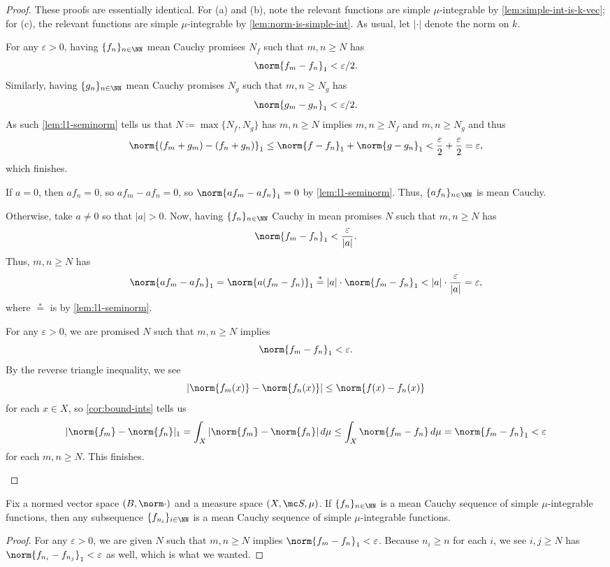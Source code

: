 \documentclass[../notes.tex]{subfiles}
\begin{document}
\begin{proof}
	These proofs are essentially identical. For (a) and (b), note the relevant functions are simple $\mu$-integrable by \autoref{lem:simple-int-is-k-vec}; for (c), the relevant functions are simple $\mu$-integrable by \autoref{lem:norm-is-simple-int}. As usual, let $|\cdot|$ denote the norm on $k$.
	\begin{listalph}
		\item For any $\varepsilon>0$, having $\{f_n\}_{n\in\NN}$ mean Cauchy promises $N_f$ such that $m,n\ge N$ has
		\[\norm{f_m-f_n}_1<\varepsilon/2.\]
		Similarly, having $\{g_n\}_{n\in\NN}$ mean Cauchy promises $N_g$ such that $m,n\ge N_g$ has
		\[\norm{g_m-g_n}_1<\varepsilon/2.\]
		As such \autoref{lem:l1-seminorm} tells us that $N\coloneqq\max\{N_f,N_g\}$ has $m,n\ge N$ implies $m,n\ge N_f$ and $m,n\ge N_g$ and thus
		\[\norm{(f_m+g_m)-(f_n+g_n)}_1\le\norm{f-f_n}_1+\norm{g-g_n}_1<\frac\varepsilon2+\frac\varepsilon2=\varepsilon,\]
		which finishes.
		\item If $a=0$, then $af_n=0$, so $af_m-af_n=0$, so $\norm{af_m-af_n}_1=0$ by \autoref{lem:l1-seminorm}. Thus, $\{af_n\}_{n\in\NN}$ is mean Cauchy.

		Otherwise, take $a\ne0$ so that $|a|>0$. Now, having $\{f_n\}_{n\in\NN}$ Cauchy in mean promises $N$ such that $m,n\ge N$ has
		\[\norm{f_m-f_n}_1<\frac\varepsilon{|a|}.\]
		Thus, $m,n\ge N$ has
		\[\norm{af_m-af_n}_1=\norm{a(f_m-f_n)}_1\stackrel*=|a|\cdot\norm{f_m-f_n}_1<|a|\cdot\frac\varepsilon{|a|}=\varepsilon,\]
		where $\stackrel*=$ is by \autoref{lem:l1-seminorm}.
		\item For any $\varepsilon>0$, we are promised $N$ such that $m,n\ge N$ implies
		\[\norm{f_m-f_n}_1<\varepsilon.\]
		By the reverse triangle inequality, we see
		\[|\norm{f_m(x)}-\norm{f_n(x)}|\le\norm{f(x)-f_n(x)}\]
		for each $x\in X$, so \autoref{cor:bound-ints} tells us
		\[|\norm {f_m}-\norm{f_n}|_1=\int_X|\norm {f_m}-\norm{f_n}|\,d\mu\le\int_X\norm{{f_m}-f_n}\,d\mu=\norm{f_m-f_n}_1<\varepsilon\]
		for each $m,n\ge N$. This finishes.
		\qedhere
	\end{listalph}
\end{proof}
\begin{lemma} \label{lem:mean-cauchy-subsequence}
	Fix a normed vector space $(B,\norm\cdot)$ and a measure space $(X,\mc S,\mu)$. If $\{f_n\}_{n\in\NN}$ is a mean Cauchy sequence of simple $\mu$-integrable functions, then any subsequence $\{f_{n_i}\}_{i\in\NN}$ is a mean Cauchy sequence of simple $\mu$-integrable functions.
\end{lemma}
\begin{proof}
	For any $\varepsilon>0$, we are given $N$ such that $m,n\ge N$ implies $\norm{f_m-f_n}_1<\varepsilon$. Because $n_i\ge n$ for each $i$, we see $i,j\ge N$ has $\norm{f_{n_i}-f_{n_j}}_1<\varepsilon$ as well, which is what we wanted.
\end{proof}
\end{document}
